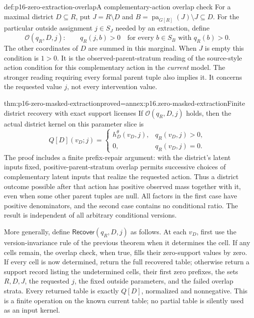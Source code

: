 \begin{hbdefinition}{def:p16-zero-extraction-overlap}{A complementary-action overlap check}
For a maximal district \(D\subseteq R\), put \(J=R\setminus D\)
and \(B=\operatorname{pa}_{G[R]}(J)\setminus J\subseteq D\).
For the particular outside assignment \(j\in S_J\) needed by
an extraction, define
\[
 \mathcal O(q_R,D,j):\qquad
 q_R(j,b)>0\quad\text{for every }b\in S_B\text{ with }q_R(b)>0.
\]
The other coordinates of \(D\) are summed in this marginal.
When \(J\) is empty this condition is \(1>0\).
It is the observed-parent-stratum reading of the source-style action
condition for this complementary action in the \emph{current} model.
The stronger reading requiring every formal parent tuple also implies it.
It concerns the requested value \(j\), not every intervention value.
\end{hbdefinition}

\begin{hbtheorem}{thm:p16-zero-masked-extraction}{proved=annex:p16.zero-masked-extraction}{Finite district recovery with exact support licenses}
If \(\mathcal O(q_R,D,j)\) holds, then the actual district
kernel on this parameter slice is
\[
 Q[D](v_D;j)=
 \begin{cases}
  h_D^\theta(v_D,j),&q_R(v_D,j)>0,\\
  0,&q_R(v_D,j)=0.
 \end{cases}
\]
The proof includes a finite prefix-repair argument: with the district's
latent inputs fixed, positive-parent-stratum overlap permits successive
choices of complementary latent inputs that realize the requested action.
Thus a district outcome possible after that action has positive observed
mass together with it, even when some other parent tuples are null.
All factors in the first case have positive denominators, and the
second case contains no conditional ratio. The result is independent
of all arbitrary conditional versions.

More generally, define \(\mathsf{Recover}(q_R,D,j)\) as follows.
At each \(v_D\), first use the version-invariance rule of the
previous theorem when it determines the cell. If any cells remain,
the overlap check, when true, fills their zero-support values by zero.
If every cell is now determined, return the full recovered table;
otherwise return a support record listing the undetermined cells,
their first zero prefixes, the sets \(R,D,J\), the requested
\(j\), the fixed outside parameters, and the failed overlap strata.
Every returned table is exactly \(Q[D]\), normalized and
nonnegative. This is a finite operation on the known current table;
no partial table is silently used as an input kernel.
\end{hbtheorem}

